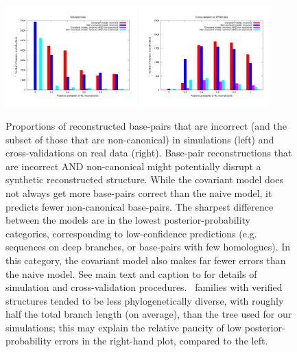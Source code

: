 \documentclass[10pt]{article}
\begin{document}
\begin{figure}[p]
  \begin{center}
     \includegraphics [width=0.45\textwidth] {figs/hammer_hist.pdf}
     \hspace*{\fill}
     \includegraphics [width=0.45\textwidth] {figs/xval_hist.pdf}
  \end{center}
  \caption{
    Proportions of reconstructed base-pairs that are incorrect (and the subset of those that are non-canonical)
    in simulations (left) and cross-validations on real data (right).
    Base-pair reconstructions that are incorrect AND non-canonical
    might potentially disrupt a synthetic reconstructed structure.
    While the covariant model does not always get more base-pairs correct than the naive model,
    it predicts fewer non-canonical base-pairs.
    The sharpest difference between the models are in the lowest posterior-probability categories,
    corresponding to low-confidence predictions (e.g. sequences on deep branches, or base-pairs with few homologues).
    In this category, the covariant model also makes far fewer errors than the naive model.
    See main text and caption to  for details of simulation and cross-validation procedures.
    \RFAM\ families with verified structures tended to be less phylogenetically diverse,
    with roughly half the total branch length (on average), than the tree used for our simulations;
    this may explain the relative paucity of low posterior-probability errors in the right-hand plot, compared to the left.
  }
\end{figure}
\end{document}
